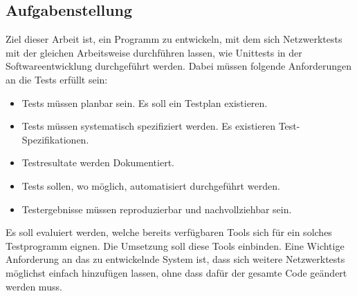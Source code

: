 \documentclass[]{subfiles}
\begin{document}
    \subsection{Aufgabenstellung}
    Ziel dieser Arbeit ist, ein Programm zu entwickeln, mit dem sich Netzwerktests mit 
    der gleichen Arbeitsweise durchführen lassen, wie Unittests in der Softwareentwicklung
    durchgeführt werden. Dabei müssen folgende Anforderungen an die Tests erfüllt sein:
    \begin{itemize}
        \item Tests müssen planbar sein. Es soll ein Testplan existieren.
        \item Tests müssen systematisch spezifiziert werden. Es existieren Test-Spezifikationen.
        \item Testresultate werden Dokumentiert.
        \item Tests sollen, wo möglich, automatisiert durchgeführt werden.
        \item Testergebnisse müssen reproduzierbar und nachvollziehbar sein.
    \end{itemize}
    Es soll evaluiert werden, welche bereits verfügbaren Tools sich für ein solches Testprogramm
    eignen. Die Umsetzung soll diese Tools einbinden.
    Eine Wichtige Anforderung an das zu entwickelnde System ist, dass sich weitere 
    Netzwerktests möglichst einfach hinzufügen lassen, ohne dass dafür der gesamte Code
    geändert werden muss. 
    
\end{document}

